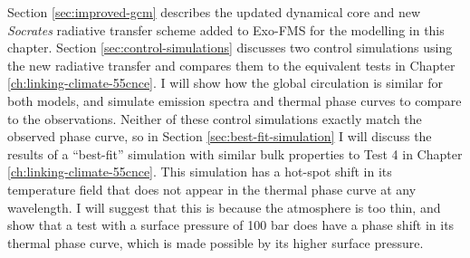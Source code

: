 




Section \ref{sec:improved-gcm} describes the updated dynamical core and new \textit{Socrates} radiative transfer scheme added to Exo-FMS for the modelling in this chapter. Section \ref{sec:control-simulations} discusses two control simulations using the new radiative transfer and compares them to the equivalent tests in Chapter \ref{ch:linking-climate-55cnce}. I will show how the global circulation is similar for both models, and simulate emission spectra and thermal phase curves to compare to the observations. Neither of these control simulations exactly match the observed phase curve, so in Section \ref{sec:best-fit-simulation} I will discuss the results of a ``best-fit'' simulation with similar bulk properties to Test 4 in Chapter \ref{ch:linking-climate-55cnce}. This simulation has a hot-spot shift in its temperature field that does not appear in the thermal phase curve at any wavelength. I will suggest that this is because the atmosphere is too thin, and show that a test with a surface pressure of 100 bar does have a phase shift in its thermal phase curve, which is made possible by its higher surface pressure.




